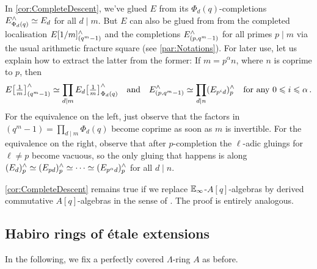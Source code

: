 \documentclass[DIV=12,numbers=enddot,leqno,bibliography=totoc]{scrartcl}
\begin{document}
	\begin{rem}\label{rem:GluingCompletions}
		In \cref{cor:CompleteDescent}, we've glued $E$ from its $\Phi_d(q)$-completions $E_{\Phi_d(q)}^\wedge\simeq E_d$ for all $d\mid m$. But $E$ can also be glued from from the completed localisation $E[1/m]_{(q^m-1)}^\wedge$ and the completions $E_{(p,q^m-1)}^\wedge$ for all primes $p\mid m$ via the usual arithmetic fracture square (see \cref{par:Notations}). For later use, let us explain how to extract the latter from the former: If $m=p^\alpha n$, where $n$ is coprime to $p$, then
		\begin{equation*}
			E\left[\localise{m}\right]_{(q^m-1)}^\complete\simeq \prod_{d\mid m}E_d\left[\localise{m}\right]_{\Phi_d(q)}^\complete\quad\text{and}\quad E_{(p,q^m-1)}^\complete \simeq \prod_{d\mid n}(E_{p^id})_p^\complete\quad \text{for any }0\leqslant i\leqslant \alpha\,.
		\end{equation*}
		For the equivalence on the left, just observe that the factors in $(q^m-1)=\prod_{d\mid m}\Phi_d(q)$ become coprime as soon as $m$ is invertible. For the equivalence on the right, observe that after $p$-completion the $\ell$-adic gluings for $\ell\neq p$ become vacuous, so the only gluing that happens is along $(E_d)_p^\wedge\simeq (E_{pd})_p^\wedge\simeq \dotsb\simeq (E_{p^\alpha d})_p^\wedge$ for all $d\mid n$.
	\end{rem}
	\begin{rem}\label{rem:CompleteDescentDAlg}
		\cref{cor:CompleteDescent} remains true if we replace $\mathbb{E}_\infty$-$A[q]$-algebras by derived commutative $A[q]$-algebras in the sense of \cite[Example~]{RaksitFilteredCircle}. The proof is entirely analogous.
	\end{rem}
	
	
	\subsection{Habiro rings of étale extensions}\label{subsec:HabiroRingOfNumberField}
	In the following, we fix a perfectly covered $\Lambda$-ring $A$ as before.
	
\end{document}
